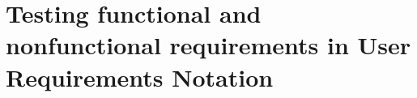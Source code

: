 \chapter{Testing functional and nonfunctional requirements in User Requirements Notation}\label{sec:topic_8}

